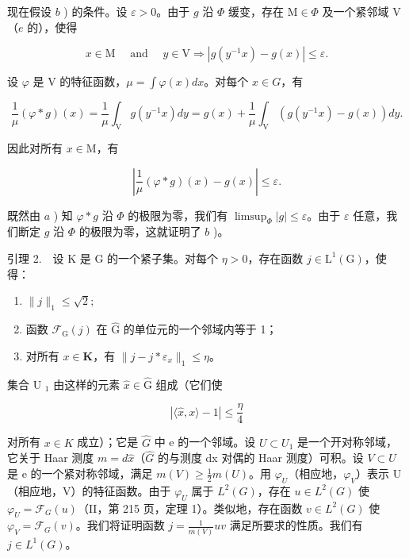 现在假设 \(b\) ) 的条件。设 \(\varepsilon > 0\)。由于 \(g\) 沿 \(\Phi\) 缓变，存在 \(\mathrm{M} \in \Phi\) 及一个紧邻域 \(\mathrm{V}\)（\(e\) 的），使得

\[
 x \in \mathrm{M} \quad \text { and } \quad y \in \mathrm{V} \Longrightarrow | g (y ^ {- 1} x) - g (x) | \leqslant \varepsilon .
\]

设 \(\varphi\) 是 V 的特征函数，\(\mu = \int \varphi(x)dx\)。对每个 \(x \in G\)，有

\[
\frac {1}{\mu} (\varphi * g) (x) = \frac {1}{\mu} \int_ {\mathrm{V}} g (y ^ {- 1} x) d y = g (x) + \frac {1}{\mu} \int_ {\mathrm{V}} (g (y ^ {- 1} x) - g (x)) d y.
\]

因此对所有 \(x \in \mathrm{M}\)，有

\[
\left| \frac {1}{\mu} (\varphi * g) (x) - g (x) \right| \leqslant \varepsilon .
\]

既然由 \(a\) ) 知 \(\varphi * g\) 沿 \(\Phi\) 的极限为零，我们有 \(\limsup_{\Phi} |g| \leqslant \varepsilon\)。由于 \(\varepsilon\) 任意，我们断定 \(g\) 沿 \(\Phi\) 的极限为零，这就证明了 \(b\) )。

引理 2.　设 K 是 G 的一个紧子集。对每个 \(\eta > 0\)，存在函数 \(j \in \mathrm{L}^{1}(\mathrm{G})\)，使得：

\begin{enumerate}
\def\labelenumi{\alph{enumi})}
\item
  \(\|j\|_{1}\leqslant\sqrt{2};\)
\item
  函数 \(\mathcal{F}_{\mathrm{G}}(j)\) 在 \(\widehat{\mathrm{G}}\) 的单位元的一个邻域内等于 1；
\item
  对所有 \(x \in \mathbf{K}\)，有 \(\| j - j * \varepsilon_x\|_1 \leqslant \eta\)。
\end{enumerate}

集合 U \(_{1}\) 由这样的元素 \(\widehat{x} \in \widehat{\mathrm{G}}\) 组成（它们使

\[
| \langle \widehat {x}, x \rangle - 1 | \leqslant \frac {\eta}{4}
\]

 对所有 \(x \in K\) 成立）；它是 \(\hat{G}\) 中 e 的一个邻域。设 \(U \subset U_{1}\) 是一个开对称邻域，它关于 Haar 测度 \(m = d\hat{x}\)（\(\hat{G}\) 的与测度 dx 对偶的 Haar 测度）可积。设 \(V \subset U\) 是 e 的一个紧对称邻域，满足 \(m(V) \geqslant \frac{1}{2}m(U)\)。用 \(\varphi_{U}\)（相应地，\(\varphi_{V}\)）表示 U（相应地，V）的特征函数。由于 \(\varphi_{U}\) 属于 \(L^{2}(G)\)，存在 \(u \in L^{2}(G)\) 使 \(\varphi_{U} = \mathcal{F}_{G}(u)\)（II，第 215 页，定理 1）。类似地，存在函数 \(v \in L^{2}(G)\) 使 \(\varphi_{V} = \mathcal{F}_{G}(v)\)。我们将证明函数 \(j = \frac{1}{m(V)}uv\) 满足所要求的性质。我们有 \(j \in L^{1}(G)\)。

